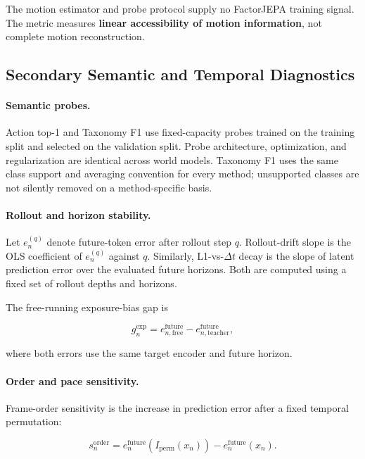 The motion estimator and probe protocol supply no FactorJEPA training
signal. The metric measures \textbf{linear accessibility of motion
information}, not complete motion reconstruction.


\subsection{Secondary Semantic and Temporal Diagnostics}
\label{app:secondary_metric_definitions}

\paragraph{Semantic probes.}
Action top-1 and Taxonomy F1 use fixed-capacity probes trained on the
training split and selected on the validation split. Probe architecture,
optimization, and regularization are identical across world models.
Taxonomy F1 uses the same class support and averaging convention for
every method; unsupported classes are not silently removed on a
method-specific basis.

\paragraph{Rollout and horizon stability.}
Let \(e_n^{(q)}\) denote future-token error after rollout step \(q\).
Rollout-drift slope is the OLS coefficient of \(e_n^{(q)}\) against
\(q\). Similarly, L1-vs-\(\Delta t\) decay is the slope of latent
prediction error over the evaluated future horizons. Both are computed
using a fixed set of rollout depths and horizons.

The free-running exposure-bias gap is

\begin{equation*}
g_n^{\mathrm{exp}}
=
e_{n,\mathrm{free}}^{\mathrm{future}}
-
e_{n,\mathrm{teacher}}^{\mathrm{future}},
\end{equation*}

where both errors use the same target encoder and future horizon.

\paragraph{Order and pace sensitivity.}
Frame-order sensitivity is the increase in prediction error after a
fixed temporal permutation:

\begin{equation*}
s_n^{\mathrm{order}}
=
e_n^{\mathrm{future}}
\left(
I_{\mathrm{perm}}(x_n)
\right)
-
e_n^{\mathrm{future}}(x_n).
\end{equation*}

